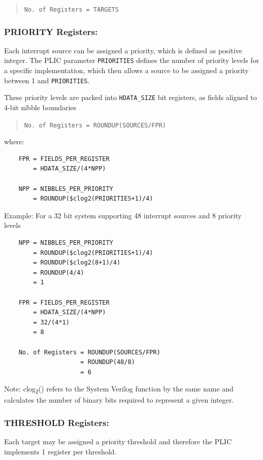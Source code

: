 \begin{quote}
\texttt{No.\ of\ Registers\ =\ TARGETS}
\end{quote}

\subsubsection{PRIORITY Registers:}

Each interrupt source can be assigned a priority, which is defined as
positive integer. The PLIC parameter \texttt{PRIORITIES} defines the
number of priority levels for a specific implementation, which then
allows a source to be assigned a priority between 1 and
\texttt{PRIORITIES}.

These priority levels are packed into
\texttt{HDATA\_SIZE} bit registers, as fields aligned to
4-bit nibble boundaries

\begin{quote}
\texttt{No.\ of\ Registers\ =\ ROUNDUP(SOURCES/FPR)}
\end{quote}
where:
\indent
\begin{verbatim}
    FPR = FIELDS_PER_REGISTER    
        = HDATA_SIZE/(4*NPP)

    NPP = NIBBLES_PER_PRIORITY
        = ROUNDUP($clog2(PRIORITIES+1)/4)
\end{verbatim}

Example: For a 32 bit system supporting 48 interrupt sources and 8
priority levels

\begin{verbatim}
    NPP = NIBBLES_PER_PRIORITY
        = ROUNDUP($clog2(PRIORITIES+1)/4)
        = ROUNDUP($clog2(8+1)/4)
        = ROUNDUP(4/4)
        = 1

    FPR = FIELDS_PER_REGISTER
        = HDATA_SIZE/(4*NPP)
        = 32/(4*1)
        = 8

    No. of Registers = ROUNDUP(SOURCES/FPR)
                     = ROUNDUP(48/8)
                     = 6
\end{verbatim}

Note: clog\textsubscript{2}() refers to the System Verilog function by
the same name and calculates the number of binary bits required to
represent a given integer.

\subsubsection{THRESHOLD Registers:}

Each target may be assigned a priority threshold and therefore the PLIC
implements 1 register per threshold.

